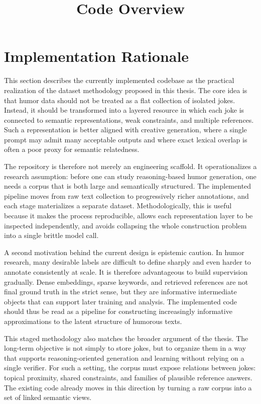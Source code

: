 \documentclass[12pt]{extarticle}
\title{Code Overview}
\author{}
\date{}
\begin{document}
\maketitle

\section{Implementation Rationale}

This section describes the currently implemented codebase as the practical realization of the dataset methodology proposed in this thesis. The core idea is that humor data should not be treated as a flat collection of isolated jokes. Instead, it should be transformed into a layered resource in which each joke is connected to semantic representations, weak constraints, and multiple references. Such a representation is better aligned with creative generation, where a single prompt may admit many acceptable outputs and where exact lexical overlap is often a poor proxy for semantic relatedness.

The repository is therefore not merely an engineering scaffold. It operationalizes a research assumption: before one can study reasoning-based humor generation, one needs a corpus that is both large and semantically structured. The implemented pipeline moves from raw text collection to progressively richer annotations, and each stage materializes a separate dataset. Methodologically, this is useful because it makes the process reproducible, allows each representation layer to be inspected independently, and avoids collapsing the whole construction problem into a single brittle model call.

A second motivation behind the current design is epistemic caution. In humor research, many desirable labels are difficult to define sharply and even harder to annotate consistently at scale. It is therefore advantageous to build supervision gradually. Dense embeddings, sparse keywords, and retrieved references are not final ground truth in the strict sense, but they are informative intermediate objects that can support later training and analysis. The implemented code should thus be read as a pipeline for constructing increasingly informative approximations to the latent structure of humorous texts.

This staged methodology also matches the broader argument of the thesis. The long-term objective is not simply to store jokes, but to organize them in a way that supports reasoning-oriented generation and learning without relying on a single verifier. For such a setting, the corpus must expose relations between jokes: topical proximity, shared constraints, and families of plausible reference answers. The existing code already moves in this direction by turning a raw corpus into a set of linked semantic views.
\end{document}
